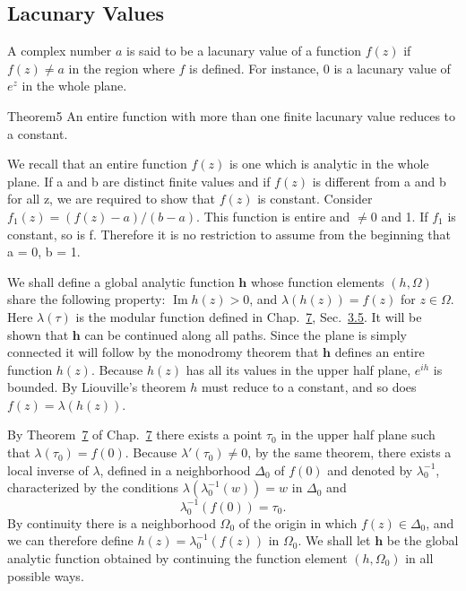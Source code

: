 \setcounter{section}{3}\setcounter{subsection}{0}\subsection{Lacunary Values}\label{sec:8.3.1}
A complex number $a$ is said to be a lacunary value of a function $f(z)$ if $f(z) \neq a$ in the region where $f$ is defined. For instance, 0 is a lacunary value of $e^z$ in the whole plane.

\begin{originalstatement}[Picard]{Theorem}{5}\label{thm:8.5}
An entire function with more than one finite lacunary value reduces to a constant.
\end{originalstatement}
We recall that an entire function $f(z)$ is one which is analytic in the whole plane. If a and b are distinct finite values and if $f(z)$ is different from a and b for all z, we are required to show that $f(z)$ is constant. Consider $f_{1}(z) = (f(z) - a)/(b - a)$. This function is entire and $\neq 0$ and 1. If $f_{1}$ is constant, so is f. Therefore it is no restriction to assume from the beginning that a = 0, b = 1.

We shall define a global analytic function $\mathbf{h}$ whose function elements $(h,\Omega)$ share the following property: $\operatorname{Im} h(z) > 0$, and $\lambda(h(z)) = f(z)$ for $z \in \Omega$. Here $\lambda(\tau)$ is the modular function defined in Chap.~\hyperref[chap:7]{7}, Sec.~\hyperref[sec:7.3.5]{3.5}. It will be shown that $\mathbf{h}$ can be continued along all paths. Since the plane is simply connected it will follow by the monodromy theorem that $\mathbf{h}$ defines an entire function $h(z)$. Because $h(z)$ has all its values in the upper half plane, $e^{ih}$ is bounded. By Liouville's theorem $h$ must reduce to a constant, and so does $f(z) = \lambda(h(z))$.

By Theorem~\hyperref[thm:7.7]{7} of Chap.~\hyperref[chap:7]{7} there exists a point $\tau_0$ in the upper half plane such that $\lambda(\tau_0) = f(0)$. Because $\lambda'(\tau_0) \neq 0$, by the same theorem, there exists a local inverse of $\lambda$, defined in a neighborhood $\Delta_0$ of $f(0)$ and denoted by $\lambda_0^{-1}$, characterized by the conditions $\lambda(\lambda_0^{-1}(w)) = w$ in $\Delta_0$ and
\begin{equation*}
\lambda_ {0} ^ {- 1} (f (0)) = \tau_ {0}.
\end{equation*}
By continuity there is a neighborhood $\Omega_0$ of the origin in which $f(z) \in \Delta_0$, and we can therefore define $h(z) = \lambda_0^{-1}(f(z))$ in $\Omega_0$. We shall let $\mathbf{h}$ be the global analytic function obtained by continuing the function element $(h, \Omega_0)$ in all possible ways.

